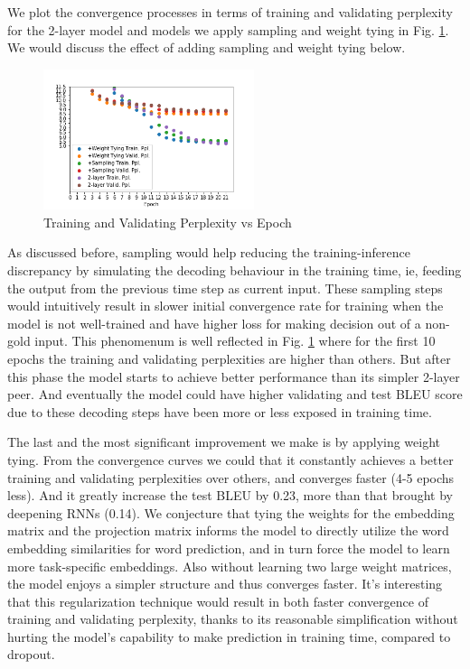 \documentclass[11pt,a4paper]{article}
\begin{document}
We plot the convergence processes in terms of training and validating perplexity for the 2-layer model and models we apply sampling and weight tying in Fig. \ref{ppls}. We would discuss the effect of adding sampling and weight tying below.

\begin{figure}
  \centering
  \includegraphics[width=0.55\textwidth]{ppls.png}
  \caption{Training and Validating Perplexity vs Epoch}
  \label{ppls}
\end{figure}


As discussed before, sampling would help reducing the training-inference discrepancy by simulating the decoding behaviour in the training time, ie, feeding the output from the previous time step as current input. These sampling steps would intuitively result in slower initial convergence rate for training when the model is not well-trained and have higher loss for making decision out of a non-gold input. This phenomenum is well reflected in Fig. \ref{ppls} where for the first 10 epochs the training and validating perplexities are higher than others. But after this phase the model starts to achieve better performance than its simpler 2-layer peer. And eventually the model could have higher validating and test BLEU score due to these decoding steps have been more or less exposed in training time.

The last and the most significant improvement we make is by applying weight tying. From the convergence curves we could that it constantly achieves a better training and validating perplexities over others, and converges faster (4-5 epochs less). And it greatly
increase the test BLEU by 0.23, more than that brought by deepening RNNs (0.14). We conjecture that tying the weights for the embedding matrix and the projection matrix informs the model to directly utilize the word embedding similarities for word prediction, and in turn force the model to learn more task-specific embeddings. Also without learning two large weight matrices, the model enjoys a simpler structure and thus converges faster. It's interesting that this regularization technique would result in both faster convergence of training and validating perplexity, thanks to its reasonable simplification without hurting the model's capability to make prediction in training time, compared to dropout.
\end{document}
